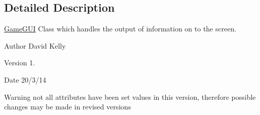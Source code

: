 \subsection{Detailed Description}
\hyperlink{class_game_g_u_i}{Game\-G\-U\-I} Class which handles the output of information on to the screen. 

\begin{DoxyAuthor}{Author}
David Kelly 
\end{DoxyAuthor}
\begin{DoxyVersion}{Version}
1. 
\end{DoxyVersion}
\begin{DoxyDate}{Date}
20/3/14
\end{DoxyDate}
\begin{DoxyWarning}{Warning}
not all attributes have been set values in this version, therefore possible changes may be made in revised versions 
\end{DoxyWarning}


